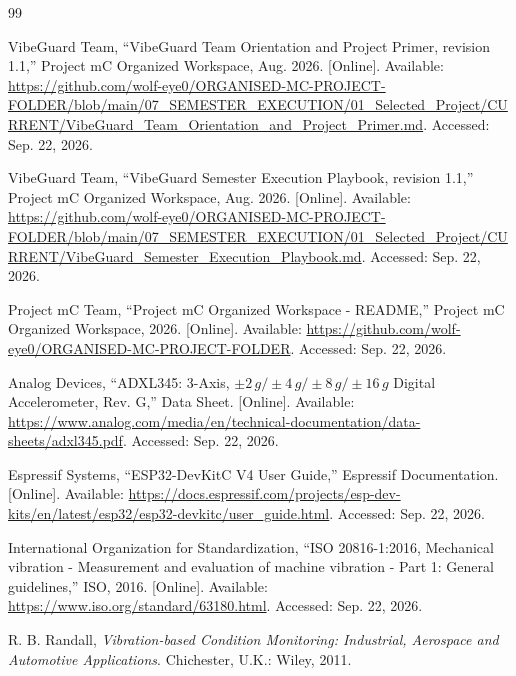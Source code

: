 \begin{thebibliography}{99}

VibeGuard Team, ``VibeGuard Team Orientation and Project Primer, revision 1.1,'' Project mC Organized Workspace, Aug. 2026. [Online]. Available: \url{https://github.com/wolf-eye0/ORGANISED-MC-PROJECT-FOLDER/blob/main/07_SEMESTER_EXECUTION/01_Selected_Project/CURRENT/VibeGuard_Team_Orientation_and_Project_Primer.md}. Accessed: Sep. 22, 2026.

VibeGuard Team, ``VibeGuard Semester Execution Playbook, revision 1.1,'' Project mC Organized Workspace, Aug. 2026. [Online]. Available: \url{https://github.com/wolf-eye0/ORGANISED-MC-PROJECT-FOLDER/blob/main/07_SEMESTER_EXECUTION/01_Selected_Project/CURRENT/VibeGuard_Semester_Execution_Playbook.md}. Accessed: Sep. 22, 2026.

Project mC Team, ``Project mC Organized Workspace - README,'' Project mC Organized Workspace, 2026. [Online]. Available: \url{https://github.com/wolf-eye0/ORGANISED-MC-PROJECT-FOLDER}. Accessed: Sep. 22, 2026.

Analog Devices, ``ADXL345: 3-Axis, \(\pm2\,g/\pm4\,g/\pm8\,g/\pm16\,g\) Digital Accelerometer, Rev. G,'' Data Sheet. [Online]. Available: \url{https://www.analog.com/media/en/technical-documentation/data-sheets/adxl345.pdf}. Accessed: Sep. 22, 2026.

Espressif Systems, ``ESP32-DevKitC V4 User Guide,'' Espressif Documentation. [Online]. Available: \url{https://docs.espressif.com/projects/esp-dev-kits/en/latest/esp32/esp32-devkitc/user_guide.html}. Accessed: Sep. 22, 2026.

International Organization for Standardization, ``ISO 20816-1:2016, Mechanical vibration - Measurement and evaluation of machine vibration - Part 1: General guidelines,'' ISO, 2016. [Online]. Available: \url{https://www.iso.org/standard/63180.html}. Accessed: Sep. 22, 2026.

R. B. Randall, \textit{Vibration-based Condition Monitoring: Industrial, Aerospace and Automotive Applications}. Chichester, U.K.: Wiley, 2011.

\end{thebibliography}
